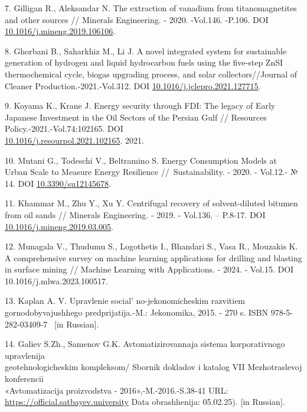 \begin{references}
7. Gilligan R., Aleksandar N. The extraction of vanadium from
titanomagnetites and other sources // Minerals Engineering. - 2020.
-Vol.146. -P.106. DOI
\href{https://doi.org/10.1016/j.mineng.2019.106106}{10.1016/j.mineng.2019.106106}.

8. Ghorbani B., Saharkhiz M., Li J. A novel integrated system for
sustainable generation of hydrogen and liquid hydrocarbon fuels using
the five-step ZnSI thermochemical cycle, biogas upgrading process, and
solar collectors//Journal of Cleaner Production.-2021.-Vol.312. DOI
\href{https://doi.org/10.1016/j.jclepro.2021.127715}{10.1016/j.jclepro.2021.127715}.

9. Koyama K., Krane J. Energy security through FDI: The legacy of Early
Japanese Investment in the Oil Sectors of the Persian Gulf //
Resources Policy.-2021.-Vol.74:102165. DOI\\
\href{https://doi.org/10.1016/j.resourpol.2021.102165}{10.1016/j.resourpol.2021.102165}.
2021.

10. Mutani G., Todeschi V., Beltramino S. Energy Consumption Models at
Urban Scale to Measure Energy Resilience //~Sustainability. - 2020. -
Vol.12.- № 14. DOI
\href{https://doi.org/10.3390/su12145678}{10.3390/su12145678}.

11. Khammar M., Zhu Y., Xu Y. Centrifugal recovery of solvent-diluted
bitumen from oil sands // Minerals Engineering. - 2019. - Vol.136. --
P.8-17. DOI
\href{https://doi.org/10.1016/j.mineng.2019.03.005}{10.1016/j.mineng.2019.03.005}.

12. Munagala V., Thudumu S., Logothetis I., Bhandari S., Vasa R., Mouzakis
K. A comprehensive survey on machine learning applications for
drilling and blasting in surface mining // Machine Learning with
Applications. - 2024. - Vol.15. DOI 10.1016/j.mlwa.2023.100517.

13. Kaplan A. V. Upravlenie social' no-jekonomicheskim
razvitiem gornodobyvajushhego predprijatija.-M.: Jekonomika, 2015. -
270 s. ISBN 978-5-282-03409-7~ {[}in Russian{]}.

14. Galiev S.Zh., Samenov G.K. Avtomatizirovannaja sistema korporativnogo
upravlenija \\geotehnologicheskim kompleksom/ Sbornik dokladov i katalog
VII Mezhotraslevoj konferencii \\«Avtomatizacija proizvodstva -
2016»,-M.-2016.-S.38-41 URL:
\href{https://official.satbayev.university/download/document/42896/МАГ_2024}{https://official.satbayev.university}
Data obrashhenija: 05.02.25). {[}in Russian{]}.


\end{references}
